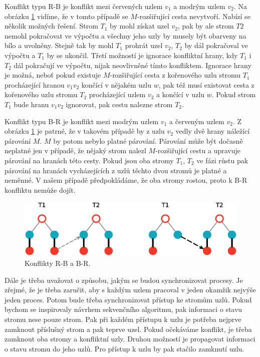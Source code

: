 \documentclass[a4paper, 11pt, titlepage, final]{article}[3. prosinec 2011]
\begin{document}
Konflikt typu R-B je konflikt mezi červených uzlem $v_1$ a modrým uzlem $v_2$. Na obrázku \ref{imgXY} vidíme, že v tomto případě se $M$-rozšiřující cesta nevytvoří. Nabízí se několik možných řešení. Strom $T_1$ by mohl získat uzel $v_2$, pak by ale strom $T2$ nemohl pokračovat ve výpočtu a všechny jeho uzly by musely být obarveny na bílo a uvolněny. Stejně tak by mohl $T_1$ prohrát uzel $v_2$, $T_2$ by dál pokračoval ve výpočtu a $T_1$ by se ukončil. Třetí možností je ignorace konfliktní hrany, kdy $T_1$ i $T_2$ dál pokračují ve výpočtu, nijak neovlivněné tímto konfliktem. Ignorace hrany je možná, neboť pokud existuje $M$-rozšiřující cesta z kořenového uzlu stromu $T_1$ procházející hranou $v_1 v_2$ končící v nějakém uzlu $w$, pak též musí existovat cesta z kořenového uzlu stromu $T_2$ procházející uzlem $v_2$ a končící v uzlu $w$. Pokud strom $T_1$ bude hranu $v_1 v_2$ ignorovat, pak cestu nalezne strom $T_2$. 

Konflikt typu B-R je konflikt mezi modrým uzlem $v_1$ a červeným uzlem $v_2$. Z obrázku \ref{imgXY} je patrné, že v takovém případě by z uzlu $v_2$ vedly dvě hrany náležící párování $M$. $M$ by potom nebylo platné párování. Párování může být dočasně neplatné jen v případě, že nějaký strom nalezl $M$-rozšiřující cestu a upravuje párování na hranách této cesty. Pokud jsou oba stromy $T_1$, $T_2$ ve fázi růstu pak párování na hranách vycházejících z uzlů těchto dvou stromů je platné a neměnné. V našem případě předpokládáme, že oba stromy rostou, proto k B-R konfliktu nemůže dojít.

\begin{figure}[ht]
  \centering
  \includegraphics[scale=0.5]{img/XYconflicts.eps}
  \caption{Konflikty R-B a B-R.}
  \label{imgXY}
\end{figure}

Dále je třeba uvažovat o způsobu, jakým se budou synchronizovat procesy. Je zřejmé, že je třeba zaručit, aby s každým uzlem pracoval v jeden okamžik nejvýše jeden proces. Potom bude třeba synchronizovat přístup ke stromům uzlů. Pokud bychom se inspirovaly návrhem sekvenčního algoritmu, pak informaci o stavu stromu nese pouze strom. Pak při každém přístupu k uzlu je potřeba nejprve zamknout příslušný strom a pak teprve uzel. Pokud očekáváme konflikt, je třeba zamknout oba stromy a konfliktní uzly. Druhou možností je propagovat informaci o stavu stromu do jeho uzlů. Pro přístup k uzlu by pak stačilo zamknutí uzlu.
\end{document}
